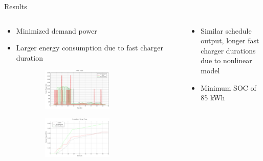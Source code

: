 \documentclass[aspectratio=169]{beamer}
\begin{document}
\begin{frame}[label={sec:orgd6f6eb1}]{Results}
\begin{columns}
\begin{column}{0.5\columnwidth}
{\scriptsize
\begin{itemize}
\item Minimized demand power
\item Larger energy consumption due to fast charger duration
\end{itemize}
}

\begin{figure}
\begin{subfigure}[t]{\textwidth}
\centering
    \includegraphics[width=0.7\textwidth]{img/sa-nonlinear/power-sa-nonlinear}
\end{subfigure}
\begin{subfigure}[t]{\textwidth}
\centering
    \includegraphics[width=0.7\textwidth]{img/sa-nonlinear/energy-sa-nonlinear}
\end{subfigure}
\end{figure}
\end{column}

\begin{column}{0.5\columnwidth}
{\scriptsize
\begin{itemize}
\item Similar schedule output, longer fast charger durations due to nonlinear model
\item Minimum SOC of 85 kWh
\end{itemize}
}


\end{column}
\end{columns}
\end{frame}
\end{document}
